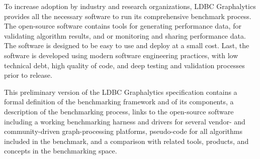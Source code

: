 {To increase adoption by industry and research organizations, 
LDBC Graphalytics provides all the necessary software to run its comprehensive benchmark process.
The open-source software contains tools for generating performance data, for validating algorithm results, 
and or monitoring and sharing performance data. 
The software is designed to be easy to use and deploy at a small cost.
Last, the software is developed using modern software engineering practices, 
with low technical debt, high quality of code, and deep testing and validation processes prior to release. 

This preliminary version of the LDBC Graphalytics specification contains 
a formal definition of the benchmarking framework and of its components, 
a description of the benchmarking process,
links to the open-source software including a working benchmarking harness and drivers for several vendor- and community-driven graph-processing platforms,
pseudo-code for all algorithms included in the benchmark,
and a comparison with related tools, products, and concepts in the benchmarking space.

}